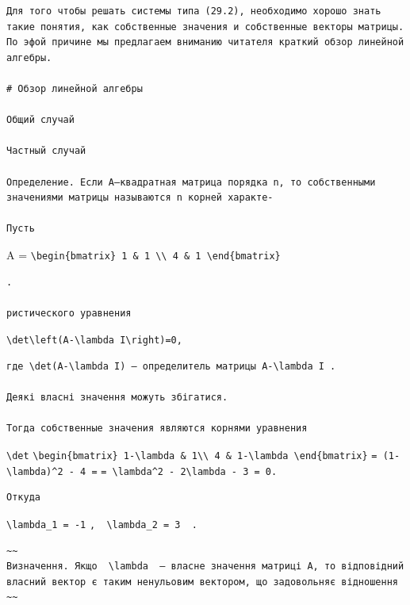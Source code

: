 \documentclass[
  ukrainian,
]{article}
\begin{document}
\begin{verbatim}
Для того чтобы решать системы типа (29.2), необходимо хорошо знать такие понятия, как собственные значения и собственные векторы матрицы. По эфой причине мы предлагаем вниманию читателя краткий обзор линейной алгебры.

# Обзор линейной алгебры

Общий случай

Частный случай

Определение. Если А—квадратная матрица порядка n, то собственными значениями матрицы называются n корней характе-

Пусть
\end{verbatim}

A =
\texttt{\textbackslash{}begin\{bmatrix\}\ 1\ \&\ 1\ \textbackslash{}\textbackslash{}\ 4\ \&\ 1\ \textbackslash{}end\{bmatrix\}}

\begin{verbatim}
.

ристического уравнения
\end{verbatim}

\texttt{\textbackslash{}det\textbackslash{}left(A-\textbackslash{}lambda\ I\textbackslash{}right)=0,}

\begin{verbatim}
где \det(A-\lambda I) — определитель матрицы A-\lambda I .

Деякі власні значення можуть збігатися.

Тогда собственные значения являются корнями уравнения
\end{verbatim}

\texttt{\textbackslash{}det}
\texttt{\textbackslash{}begin\{bmatrix\}\ 1-\textbackslash{}lambda\ \&\ 1\textbackslash{}\textbackslash{}\ 4\ \&\ 1-\textbackslash{}lambda\ \textbackslash{}end\{bmatrix\}}
\texttt{=\ (1-\textbackslash{}lambda)\^{}2\ -\ 4\ =}
\texttt{=\ \textbackslash{}lambda\^{}2\ -\ 2\textbackslash{}lambda\ -\ 3\ =\ 0.}

\begin{verbatim}
Откуда
\end{verbatim}

\texttt{\textbackslash{}lambda\_1\ =\ -1}
\texttt{,\ \ \textbackslash{}lambda\_2\ =\ 3\ \ .}

\begin{verbatim}
~~
Визначення. Якщо  \lambda  — власне значення матриці A, то відповідний власний вектор є таким ненульовим вектором, що задовольняє відношення
~~
\end{verbatim}
\end{document}
